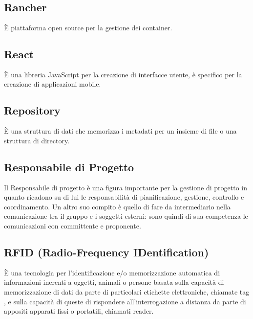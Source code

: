 \section{}

\subsection*{Rancher} È piattaforma open source per la gestione dei container.

\subsection*{React} È una libreria JavaScript per la creazione di interfacce utente, è specifico per la creazione di applicazioni mobile.

\subsection*{Repository} È una struttura di dati che memorizza i metadati per un insieme di file o una struttura di directory.

\subsection*{Responsabile di Progetto} Il Responsabile di progetto è una figura importante per la gestione di progetto in quanto ricadono su di lui le responsabilità di pianificazione, gestione, controllo e coordinamento. Un altro suo compito è quello di fare da intermediario nella comunicazione tra il gruppo e i soggetti esterni: sono quindi di sua competenza le comunicazioni con committente e proponente.

\subsection*{RFID (Radio-Frequency IDentification)} È una tecnologia per l'identificazione e/o memorizzazione automatica di informazioni inerenti a oggetti, animali o persone  basata sulla capacità di memorizzazione di dati da parte di particolari etichette elettroniche, chiamate tag , e sulla capacità di queste di rispondere all'interrogazione a distanza da parte di appositi apparati fissi o portatili, chiamati reader.
